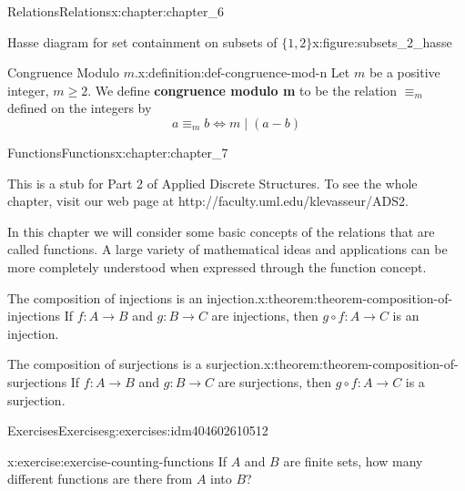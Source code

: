 \documentclass[twoside,10pt,]{book}
\newcommand{\terminology}[1]{\textbf{#1}}
\numberwithin{equation}{section}
\begin{document}
\begin{chapterptx}{Relations}{}{Relations}{}{}{x:chapter:chapter_6}
\begin{figureptx}{Hasse diagram for set containment on subsets of \(\{1,2\}\)}{x:figure:subsets_2_hasse}{}
\begin{image}{0}{1}{0}
\end{image}%
\tcblower
\end{figureptx}%
\begin{definition}{Congruence Modulo \(m\).}{x:definition:def-congruence-mod-n}%
%
\label{g:notation:idm404603090912}%
Let \(m\) be a positive integer, \(m\geq 2\).  We define \terminology{congruence modulo m} to be the relation \(\equiv_m\) defined on the integers by%
\begin{equation*}
a \equiv_m b \Leftrightarrow m \mid (a-b)
\end{equation*}
%
\end{definition}
\end{chapterptx}
%
%
\typeout{************************************************}
\typeout{************************************************}
%
\begin{chapterptx}{Functions}{}{Functions}{}{}{x:chapter:chapter_7}
\begin{introduction}{}%
This is a stub for Part 2 of Applied Discrete Structures. To see the whole chapter, visit our web page at http:\slash{}\slash{}faculty.uml.edu\slash{}klevasseur\slash{}ADS2.%
\par
In this chapter we will consider some basic concepts of the relations that are called functions. A large variety of mathematical ideas and applications can be more completely understood when expressed through the function concept.%
\end{introduction}%
\begin{theorem}{The composition of injections is an injection.}{}{x:theorem:theorem-composition-of-injections}%
If \(f: A \rightarrow  B\) and \(g : B \rightarrow  C\) are injections, then \(g\circ f : A \rightarrow  C\) is an injection.%
\end{theorem}
\begin{theorem}{The composition of surjections is a surjection.}{}{x:theorem:theorem-composition-of-surjections}%
If \(f : A \rightarrow  B\) and \(g: B \rightarrow C\) are surjections, then \(g\circ f: A \rightarrow  C\) is a surjection.%
\end{theorem}
%
%
\typeout{************************************************}
\typeout{************************************************}
%
\begin{exercises-section}{Exercises}{}{Exercises}{}{}{g:exercises:idm404602610512}
\begin{divisionexercise}{7}{}{}{x:exercise:exercise-counting-functions}%
If \(A\) and \(B\) are finite sets, how many different functions are there from \(A\) into \(B\)?%
\end{divisionexercise}%
\end{exercises-section}
\end{chapterptx}
\end{document}
